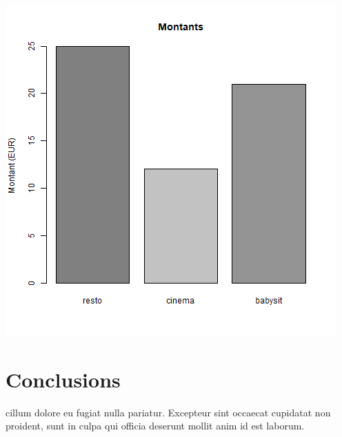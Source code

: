 \documentclass[final,anonym]{mcarticle}
\begin{document}
\begin{center}
\includegraphics[width=.75\linewidth]{images/Rplots.png}
\end{center}

\section{Conclusions}
\label{sec:org2bf66a1}

cillum dolore eu fugiat nulla pariatur. Excepteur sint occaecat cupidatat non
proident, sunt in culpa qui officia deserunt mollit anim id est laborum.
\end{document}
